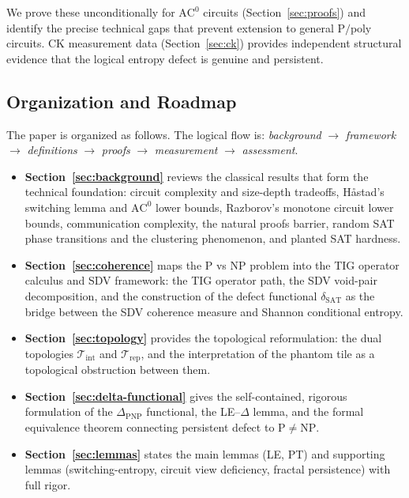 \documentclass[11pt]{article}
\theoremstyle{definition}
\theoremstyle{remark}
\newcommand{\Ppoly}{\mathrm{P/poly}}
\newcommand{\ACz}{\mathrm{AC}^0}
\newcommand{\dSAT}{\delta_{\mathrm{SAT}}}
\begin{document}
We prove these unconditionally for $\ACz$ circuits (Section~\ref{sec:proofs})
and identify the precise technical gaps that prevent extension to general
$\Ppoly$ circuits.  CK measurement data (Section~\ref{sec:ck}) provides
independent structural evidence that the logical entropy defect is genuine
and persistent.

\subsection{Organization and Roadmap}

The paper is organized as follows.  The logical flow is:
\emph{background} $\to$ \emph{framework} $\to$ \emph{definitions} $\to$
\emph{proofs} $\to$ \emph{measurement} $\to$ \emph{assessment}.

\begin{itemize}[nosep]
  \item \textbf{Section~\ref{sec:background}} reviews the classical results
    that form the technical foundation: circuit complexity and size-depth
    tradeoffs, H\aa stad's switching lemma and $\ACz$ lower bounds,
    Razborov's monotone circuit lower bounds, communication complexity,
    the natural proofs barrier, random SAT phase transitions and the
    clustering phenomenon, and planted SAT hardness.

  \item \textbf{Section~\ref{sec:coherence}} maps the P vs NP problem into
    the TIG operator calculus and SDV framework: the TIG operator path,
    the SDV void-pair decomposition, and the construction of the defect
    functional $\dSAT$ as the bridge between the SDV coherence measure and
    Shannon conditional entropy.

  \item \textbf{Section~\ref{sec:topology}} provides the topological
    reformulation: the dual topologies $\mathcal{T}_{\mathrm{int}}$ and
    $\mathcal{T}_{\mathrm{rep}}$, and the interpretation of the phantom
    tile as a topological obstruction between them.

  \item \textbf{Section~\ref{sec:delta-functional}} gives the self-contained,
    rigorous formulation of the $\Delta_{\mathrm{PNP}}$ functional, the
    LE--$\Delta$ lemma, and the formal equivalence theorem connecting
    persistent defect to $\mathrm{P} \neq \mathrm{NP}$.

  \item \textbf{Section~\ref{sec:lemmas}} states the main lemmas (LE, PT)
    and supporting lemmas (switching-entropy, circuit view deficiency,
    fractal persistence) with full rigor.


\end{itemize}
\end{document}
